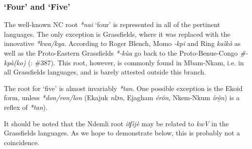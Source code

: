   
\subsubsection{‘Four’ and ‘Five’}\label{sec:3.1.1.3}
The well-known NC root \textit{*nai} `four' is represented in all of the pertinent languages. The only exception is Grassfields, where it was replaced with the innovative \textit{*kwa/kya}. According to Roger Blench, Momo \textit{-kpi} and Ring \textit{kaìkò} as well as the Proto-Eastern Grassfields \textit{*-kùa} go back to the Proto-Benue-Congo \textit{\#-kpà(ko)} (\citealt{Blench2004}: \#387). This root, however, is commonly found in Mbam-Nkam, i.e. in all Grassfields languages, and is barely attested outside this branch.

\newpage 
The root for `five' is almost invariably \textit{*tan}. One possible exception is the Ekoid form, unless \textit{*don/ron/lon} (Ekajuk \textit{nlɔn}, Ejagham \textit{ér{\^{o}}n}, Nkem-Nkum \textit{íro{\^{̱}}n}) is a reflex of \textit{*tan}).

It should be noted that the Ndemli root \textit{itʃìjè} may be related to \textit{kwV} in the Grassfields languages. As we hope to demonstrate below, this is probably not a coincidence. 

